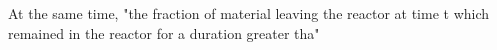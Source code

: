 At the same time, "the fraction of material leaving the reactor at time t which remained in the reactor for a duration greater tha"  